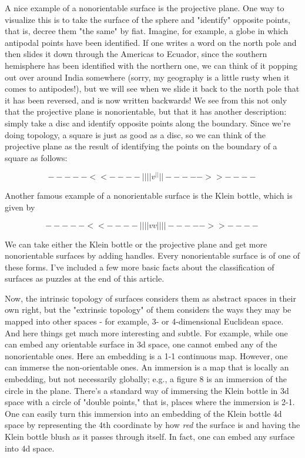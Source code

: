A nice example of a nonorientable surface is the projective plane.  One
way to visualize this is to take the surface of the sphere and
"identify" opposite points, that is, decree them "the same" by fiat.
Imagine, for example, a globe in which antipodal points have been
identified.  If one writes a word on the north pole and then slides it
down through the Americas to Ecuador, since the southern hemisphere has
been identified with the northern one, we can think of it popping out
over around India somewhere (sorry, my geography is a little rusty when
it comes to antipodes!), but we will see when we slide it back to the
north pole that it has been reversed, and is now written backwards!  We
see from this not only that the projective plane is nonorientable, but
that it has another description: simply take a disc and identify
opposite points along the boundary.  Since we're doing topology, a
square is just as good as a disc, so we can think of the projective
plane as the result of identifying the points on the boundary of a
square as follows:


$$
     -----<<----
    |           |
    |           |  
    v           ^
    |           |
    |           |
     ----->>----

$$
    

Another famous example of a nonorientable surface is the Klein bottle,
which is given by


$$
     -----<<----
    |           |
    |           |
    v           v
    |           |
    |           |
     ----->>----

$$
    

We can take either the Klein bottle or the projective plane and get more
nonorientable surfaces by adding handles.  Every nonorientable surface
is of one of these forms.  I've included a few more basic facts about
the classification of surfaces as puzzles at the end of this article.

Now, the intrinsic topology of surfaces considers them as abstract
spaces in their own right, but the "extrinsic topology" of them
considers the ways they may be mapped into other spaces - for example,
3- or 4-dimensional Euclidean space.  And here things get much more
interesting and subtle.  For example, while one can embed any orientable
surface in 3d space, one cannot embed any of the nonorientable ones.
Here an embedding is a 1-1 continuous map.  However, one can immerse
the non-orientable ones.  An immersion is a map that is locally an
embedding, but not necessarily globally; e.g., a figure 8 is an
immersion of the circle in the plane.  There's a standard way of
immersing the Klein bottle in 3d space with a circle of "double points,"
that is, places where the immersion is 2-1.  One can easily turn this
immersion into an embedding of the Klein bottle 4d space by representing
the 4th coordinate by how \emph{red} the surface is and having the Klein
bottle blush as it passes through itself.  In fact, one can embed any
surface into 4d space.

